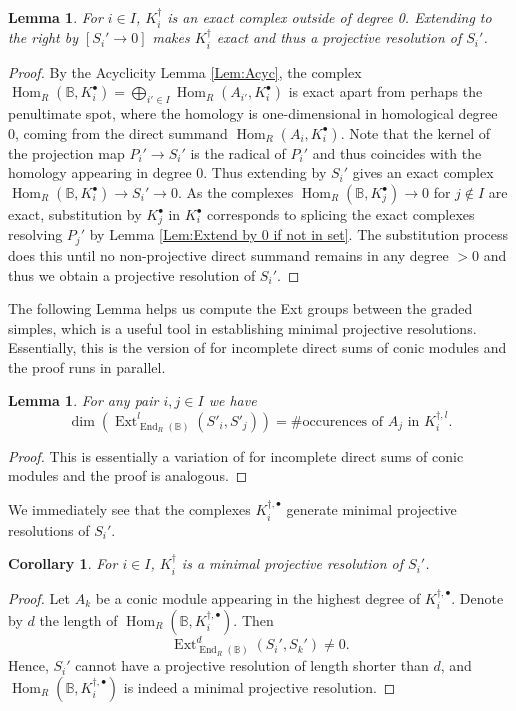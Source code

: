 \documentclass[reqno, 12pt]{amsart}
\newtheorem{lemma}[theorem]{Lemma}
\newtheorem{corollary}[theorem]{Corollary}
\theoremstyle{definition}
\numberwithin{equation}{section}
\newcommand{\Hom}{\operatorname{Hom}}
\newcommand{\End}{\operatorname{End}}
\newcommand{\Ext}{\operatorname{Ext}}
\begin{document}
\begin{lemma}
\label{Lem:Substituted is proj resn}
  For $i\in I$,  $K_i^\dagger$ is an exact complex outside of degree 0. Extending to the right by $[S_i'\rightarrow 0]$ makes $K_i^\dagger$ exact and thus a projective resolution of $S_i'$.
\end{lemma}
\begin{proof}
    By the Acyclicity Lemma \ref{Lem:Acyc}, the complex $\Hom_R(\mathbb{B},K_i^\bullet)=\bigoplus_{i'\in I}\Hom_R(A_{i'},K_i^\bullet)$ is exact apart from perhaps the penultimate spot, where the homology is one-dimensional in homological degree 0, coming from the direct summand $\Hom_R(A_i,K_i^\bullet)$. Note that the kernel of the projection map $P_i'\rightarrow S_i'$ is the radical of $P_i'$ and thus coincides with the homology appearing in degree 0. Thus extending by $S_i'$ gives an exact complex $\Hom_R(\mathbb{B},K_i^\bullet)\rightarrow S_i'\rightarrow 0$. As the complexes $\Hom_R(\mathbb{B},K_j^\bullet)\rightarrow 0$ for $j\not\in I$ are exact, substitution by $K_j^\bullet$ in $K_i^\bullet$ corresponds to splicing the exact complexes resolving $P_j'$ by Lemma \ref{Lem:Extend by 0 if not in set}. The substitution process does this until no non-projective direct summand remains in any degree $>0$ and thus we obtain a projective resolution of $S_i'$.
\end{proof}

The following Lemma helps us compute the Ext groups between the graded simples, which is a useful tool in establishing minimal projective resolutions. Essentially, this is the version of \cite[Proposition 6.6]{FMS19} for incomplete direct sums of conic modules and the proof runs in parallel.
\begin{lemma}
    \label{Lem:DimExt}
    For any pair $i,j\in I$ we have
    \[
    \dim(\Ext^l_{\End_R(\mathbb{B})}(S'_i,S'_j))=\#\text{occurences of } A_j \text{ in }K_i^{\dagger,l}.
    \]
\end{lemma}

\begin{proof}
    This is essentially a variation of \cite[Proposition 6.6]{FMS19} for incomplete direct sums of conic modules and the proof is analogous.
\end{proof}

We immediately see that the complexes $K_i^{\dagger,\bullet}$ generate minimal projective resolutions of $S_i'$.
\begin{corollary}
\label{Cor:Substituted is minimal}
    For $i\in I$, $K_i^\dagger$ is a minimal projective resolution of $S_i'$.
\end{corollary}
\begin{proof}
    Let $A_k$ be a conic module appearing in the highest degree of $K_i^{\dagger,\bullet}$. Denote by $d$ the length of $\Hom_R(\mathbb{B},K_i^{\dagger,\bullet})$. Then \[
    \Ext^{d}_{\End_R(\mathbb{B})}(S_i',S_k')\neq 0.
    \]
    Hence, $S_i'$ cannot have a projective resolution of length shorter than $d$, and $\Hom_R(\mathbb{B},K_i^{\dagger,\bullet})$ is indeed a minimal projective resolution.
\end{proof}
\end{document}
